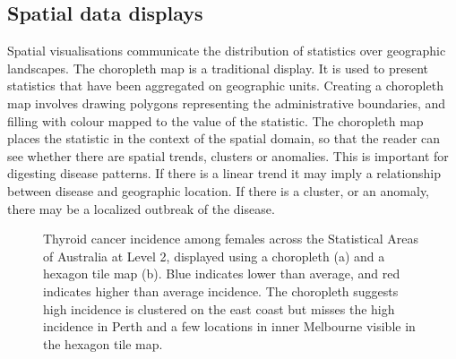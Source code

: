 \documentclass[
doublespace,
  times]{anzsauth}
\begin{document}
\subsection{Spatial data displays}\label{spatial-data-displays}

Spatial visualisations communicate the distribution of statistics over
geographic landscapes. The choropleth map \citep{EI, BCM} is a
traditional display. It is used to present statistics that have been
aggregated on geographic units. Creating a choropleth map involves
drawing polygons representing the administrative boundaries, and filling
with colour mapped to the value of the statistic. The choropleth map
places the statistic in the context of the spatial domain, so that the
reader can see whether there are spatial trends, clusters or anomalies.
This is important for digesting disease patterns. If there is a linear
trend it may imply a relationship between disease and geographic
location. If there is a cluster, or an anomaly, there may be a localized
outbreak of the disease.

\begin{figure}


\caption{\label{fig-thyroid}Thyroid cancer incidence among females
across the Statistical Areas of Australia at Level 2, displayed using a
choropleth (a) and a hexagon tile map (b). Blue indicates lower than
average, and red indicates higher than average incidence. The choropleth
suggests high incidence is clustered on the east coast but misses the
high incidence in Perth and a few locations in inner Melbourne visible
in the hexagon tile map.}

\end{figure}%
\end{document}
